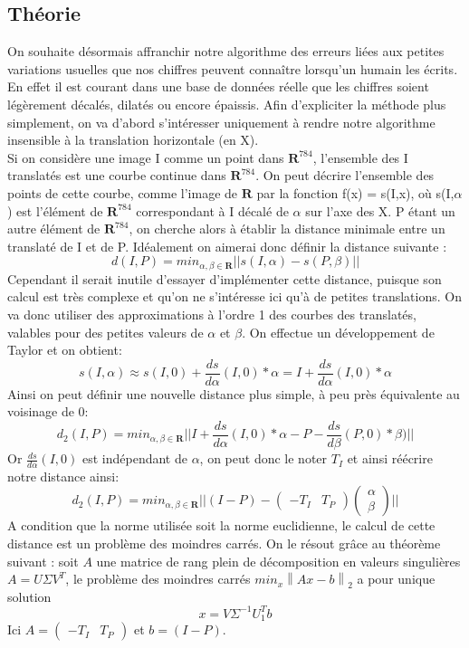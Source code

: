\documentclass[a4paper,11pt,twoside]{report}
\newcommand{\norm}[1]{\left\lVert#1\right\rVert} %
\begin{document}
\subsection{Théorie}
On souhaite désormais affranchir notre algorithme des erreurs liées aux petites variations usuelles que nos chiffres peuvent connaître lorsqu'un humain les écrits. En effet il est courant dans une base de données réelle que les chiffres soient légèrement décalés, dilatés ou encore épaissis. Afin d'expliciter la méthode plus simplement, on va d'abord s’intéresser uniquement à rendre notre algorithme insensible à la translation horizontale (en X). \\
Si on considère une image I comme un point dans $\textbf{R}^{784}$, l'ensemble des I translatés est une courbe continue dans $\textbf{R}^{784}$. On peut décrire l'ensemble des points de cette courbe, comme l'image de $\textbf{R}$ par la fonction f(x) = s(I,x), où s(I,$\alpha$) est l'élément de  $\textbf{R}^{784}$ correspondant à I décalé de $\alpha$ sur l'axe des X. P étant un autre élément de $\textbf{R}^{784}$, on cherche alors à établir la distance minimale entre un translaté de I et de P. Idéalement on aimerai donc définir la distance suivante : $$d(I,P)= min_{\alpha,\beta \in \textbf{R}} ||s(I,\alpha)-s(P,\beta)||$$
Cependant il serait inutile d'essayer d'implémenter cette distance, puisque son calcul est très complexe et qu'on ne s’intéresse ici qu'à de petites translations. On va donc utiliser des approximations à l'ordre 1 des courbes des translatés, valables pour des petites valeurs de $\alpha$ et $\beta$. On effectue un développement de Taylor et on obtient:$$s(I,\alpha)\approx s(I,0) + \frac{ds}{d\alpha}(I,0)*\alpha=I + \frac{ds}{d\alpha}(I,0)*\alpha$$
Ainsi on peut définir une nouvelle distance plus simple, à peu près équivalente au voisinage de 0: $$d_{2}(I,P)= min_{\alpha,\beta \in \textbf{R}} ||I+\frac{ds}{d\alpha}(I,0)*\alpha-P-\frac{ds}{d\beta}(P,0)*\beta)||$$
Or $\frac{ds}{d\alpha}(I,0)$ est indépendant de $\alpha$, on peut donc le noter $T_{I}$ et ainsi réécrire notre distance ainsi: $$d_{2}(I,P)= min_{\alpha,\beta \in \textbf{R}} ||(I-P)-\begin{pmatrix}-T_{I} & T_{P}\end{pmatrix} \begin{pmatrix}\alpha \\ \beta\end{pmatrix} ||$$ 
A condition que la norme utilisée soit la norme euclidienne, le calcul de cette distance est un problème des moindres carrés. On le résout grâce au théorème suivant : soit $A$ une matrice de rang plein de décomposition en valeurs singulières $A = U\Sigma V^T$, le problème des moindres carrés $min_x\norm{Ax-b}_2$ a pour unique solution $$x = V\Sigma^{-1}U_1^Tb$$ Ici $A = \begin{pmatrix}-T_{I} & T_{P}\end{pmatrix}$ et $b = (I-P)$.\\
\end{document}

